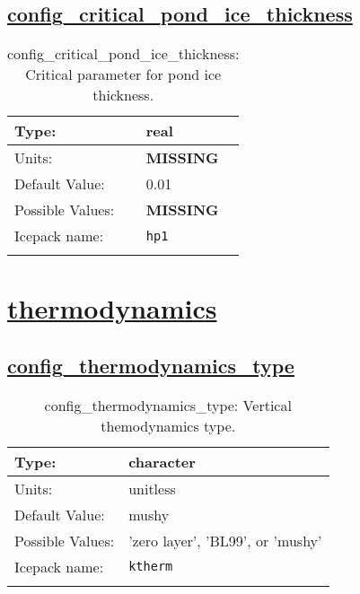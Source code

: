 \subsection[config\_critical\_pond\_ice\_thickness]{\hyperref[sec:nm_tab_meltponds]{config\_critical\_pond\_ice\_thickness}}
\label{subsec:nm_sec_config_critical_pond_ice_thickness}
\begin{center}
\begin{longtable}{| p{2.0in} || p{4.0in} |}
    \hline
    Type: & real \\
    \hline
    Units: & {\bf \color{red} MISSING} \\
    \hline
    Default Value: & 0.01 \\
    \hline
    Possible Values: & {\bf \color{red} MISSING} \\
    \hline
    \hline
    Icepack name: & \verb+hp1+ \\
    \caption{config\_critical\_pond\_ice\_thickness: Critical parameter for pond ice thickness.}
\end{longtable}
\end{center}
\section[thermodynamics]{\hyperref[sec:nm_tab_thermodynamics]{thermodynamics}}
\label{sec:nm_sec_thermodynamics}
\subsection[config\_thermodynamics\_type]{\hyperref[sec:nm_tab_thermodynamics]{config\_thermodynamics\_type}}
\label{subsec:nm_sec_config_thermodynamics_type}
\begin{center}
\begin{longtable}{| p{2.0in} || p{4.0in} |}
    \hline
    Type: & character \\
    \hline
    Units: & \si{unitless} \\
    \hline
    Default Value: & mushy \\
    \hline
    Possible Values: & 'zero layer', 'BL99', or 'mushy' \\
    \hline
    \hline
    Icepack name: & \verb+ktherm+ \\
    \caption{config\_thermodynamics\_type: Vertical themodynamics type.}
\end{longtable}
\end{center}
